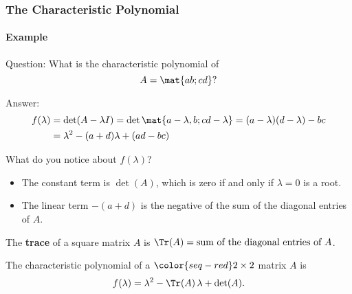 \begin{frame}
\frametitle{The Characteristic Polynomial}
\framesubtitle{Example}

\alert{Question:} What is the characteristic polynomial of
\[ A = \mat{a b; c d}? \]

\displayskips{3pt}
\begin{webonly}
\alert{Answer:}\vskip -5mm
\[\begin{split} f(\lambda) &= \det(A-\lambda I)
= \det\mat{a-\lambda, b; c d-\lambda} 
= (a-\lambda)(d-\lambda) - bc \\
&= \lambda^2 - (a+d)\lambda + (ad-bc)
\end{split}\]
\end{webonly}

\pause
What do you notice about $f(\lambda)$?

\begin{itemize}
\pause
\item The constant term is $\det(A)$, which is zero if and only if
  \pause
  $\lambda=0$ is a root.

  \pause
\item The linear term $-(a+d)$ is the negative of the sum of the diagonal
  entries of $A$.
\end{itemize}

\pause
\begin{defn}
  The \textbf{trace} of a square matrix $A$ is 
  $\Tr(A) = \text{sum of the diagonal entries of $A$}$.
\end{defn}

\pause
\begin{bluebox}[Shortcut]{.7\linewidth}
  \displayskips{3pt}
  The characteristic polynomial of a $\color{seq-red}2\times 2$ matrix $A$ is
  \[ f(\lambda) = \lambda^2 - \Tr(A)\,\lambda + \det(A). \]
\end{bluebox}

\end{frame}



